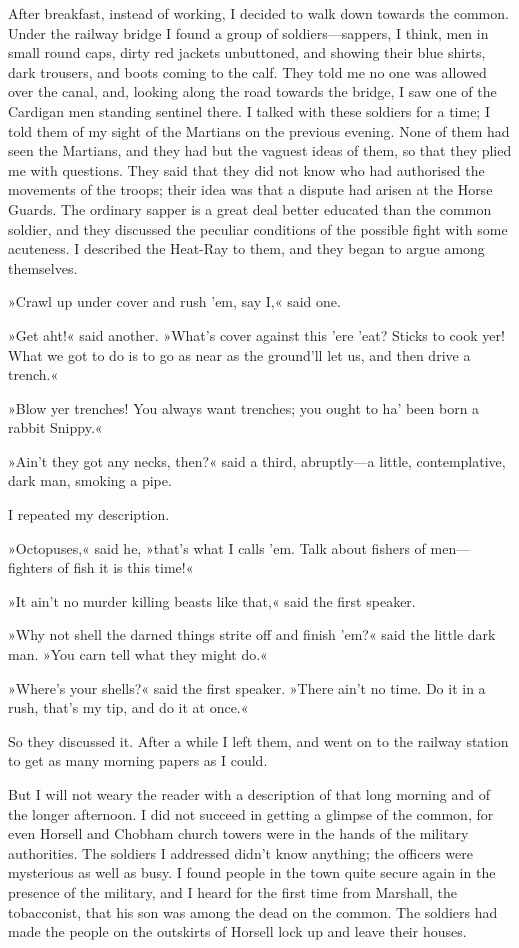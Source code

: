 After breakfast, instead of working, I decided to walk down towards the common. Under the railway bridge I found a group of soldiers—sappers, I think, men in small round caps, dirty red jackets unbuttoned, and showing their blue shirts, dark trousers, and boots coming to the calf. They told me no one was allowed over the canal, and, looking along the road towards the bridge, I saw one of the Cardigan men standing sentinel there. I talked with these soldiers for a time; I told them of my sight of the Martians on the previous evening. None of them had seen the Martians, and they had but the vaguest ideas of them, so that they plied me with questions. They said that they did not know who had authorised the movements of the troops; their idea was that a dispute had arisen at the Horse Guards. The ordinary sapper is a great deal better educated than the common soldier, and they discussed the peculiar conditions of the possible fight with some acuteness. I described the Heat-Ray to them, and they began to argue among themselves.

»Crawl up under cover and rush 'em, say I,« said one.

»Get aht!« said another. »What's cover against this 'ere 'eat? Sticks to cook yer! What we got to do is to go as near as the ground'll let us, and then drive a trench.«

»Blow yer trenches! You always want trenches; you ought to ha' been born a rabbit Snippy.«

»Ain't they got any necks, then?« said a third, abruptly—a little, contemplative, dark man, smoking a pipe.

I repeated my description.

»Octopuses,« said he, »that's what I calls 'em. Talk about fishers of men—fighters of fish it is this time!«

»It ain't no murder killing beasts like that,« said the first speaker.

»Why not shell the darned things strite off and finish 'em?« said the little dark man. »You carn tell what they might do.«

»Where's your shells?« said the first speaker. »There ain't no time. Do it in a rush, that's my tip, and do it at once.«

So they discussed it. After a while I left them, and went on to the railway station to get as many morning papers as I could.

But I will not weary the reader with a description of that long morning and of the longer afternoon. I did not succeed in getting a glimpse of the common, for even Horsell and Chobham church towers were in the hands of the military authorities. The soldiers I addressed didn't know anything; the officers were mysterious as well as busy. I found people in the town quite secure again in the presence of the military, and I heard for the first time from Marshall, the tobacconist, that his son was among the dead on the common. The soldiers had made the people on the outskirts of Horsell lock up and leave their houses.

